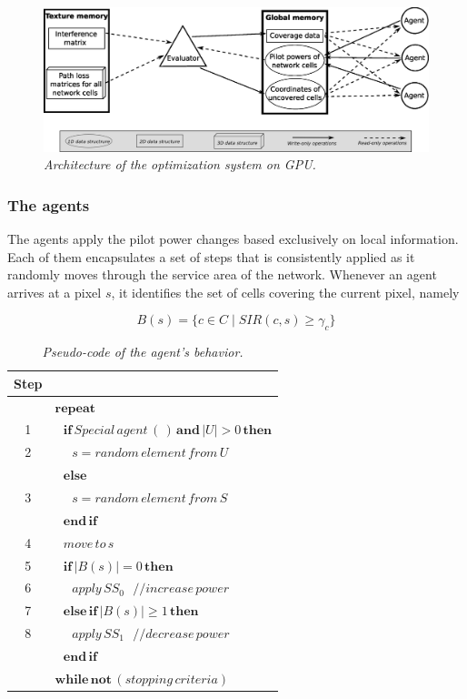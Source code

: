 \begin{figure}
\centering

\includegraphics[width=1\textwidth]{06-experimental_evaluation-service_coverage/img/architecture}

\caption{\textit{Architecture of the optimization system on GPU.\label{fig:Architecture}}}
\end{figure}



\subsubsection{The agents}

The agents apply the pilot power changes based exclusively on local
information. Each of them encapsulates a set of steps that is consistently
applied as it randomly moves through the service area of the network.
Whenever an agent arrives at a pixel $s$, it identifies the set of
cells covering the current pixel, namely 

\begin{equation}
B(s)=\{c\in C\mid SIR(c,s)\ge\gamma_{c}\}
\end{equation}


\begin{table}
\caption{\textit{Pseudo-code of the agent's behavior.\label{tab:Agent-behavior}}}


\centering

\begin{tabular}{c|l}
\hline 
Step & \tabularnewline[\doublerulesep]
\hline 
 & $\mathbf{repeat}$\tabularnewline
1 & $\,\,\,\,\mathbf{if}\, Special\, agent\,(\,)\,\mathbf{and}\,|U|>0\,\mathbf{then}$\tabularnewline
2 & $\,\,\,\,\,\,\,\, s=random\, element\, from\, U$\tabularnewline
 & $\,\,\,\,\mathbf{else}$\tabularnewline
3 & $\,\,\,\,\,\,\,\, s=random\, element\, from\, S$\tabularnewline
 & $\,\,\,\,\mathbf{end\, if}$\tabularnewline
4 & $\,\,\,\, move\, to\, s$\tabularnewline
5 & $\,\,\,\,\mathbf{if}\,|B(s)|=0\,\mathbf{then}$\tabularnewline
6 & $\,\,\,\,\,\,\,\, apply\, SS_{0}\,\,\,\,//increase\, power$\tabularnewline
7 & $\,\,\,\,\mathbf{else\,}\mathbf{if}\,|B(s)|\ge1\,\mathbf{then}$\tabularnewline
8 & $\,\,\,\,\,\,\,\, apply\, SS_{1}\,\,\,\,//decrease\, power$\tabularnewline
 & $\,\,\,\,\mathbf{end\, if}$\tabularnewline
 & $\mathbf{while\,}\mathbf{not}\,(stopping\, criteria)$\tabularnewline
\hline 
\end{tabular}
\end{table}


